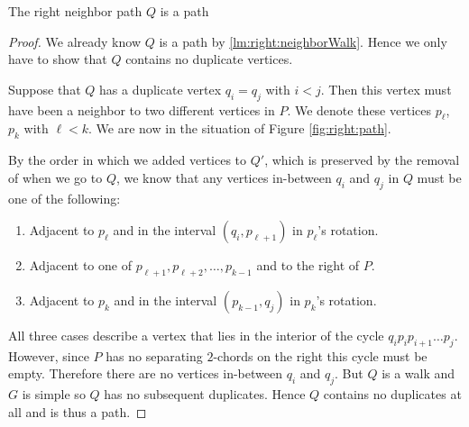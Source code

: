     \begin{lemma}
      \label{lm:right:neighborPath}
      The right neighbor path $Q$ is a path
    \end{lemma}
    \begin{proof}
      We already know $Q$ is a path by \ref{lm:right:neighborWalk}. Hence we only have to show that $Q$ contains no duplicate vertices.

      Suppose that $Q$ has a duplicate vertex $q_i=q_j$ with $i<j$. Then this vertex must have been a neighbor to two different vertices in $P$. We denote these vertices $p_\ell$, $p_k$ with $\ell<k$. We are now in the situation of Figure \ref{fig:right:path}.

      By the order in which we added vertices to $Q'$, which is preserved by the removal of when we go to $Q$, we know that any vertices in-between $q_i$ and $q_j$ in $Q$ must be one of the following:
      \begin{enumerate}
        \item Adjacent to $p_\ell$ and in the interval $(q_i, p_{\ell+1})$ in $p_\ell$'s rotation.
        \item Adjacent to one of $p_{\ell+1},  p_{\ell+2},\ldots, p_{k-1}$ and to the right of $P$.
        \item Adjacent to $p_k$ and in the interval $(p_{k-1}, q_j)$ in $p_k$'s rotation.
      \end{enumerate}


      All three cases describe a vertex that lies in the interior of the cycle $q_i p_i p_{i+1} \ldots p_j$. However, since $P$ has no separating $2$-chords on the right this cycle must be empty. Therefore there are no vertices in-between $q_i$ and $q_j$. But $Q$ is a walk and $G$ is simple  so $Q$ has no subsequent duplicates. Hence $Q$ contains no duplicates at all and is thus a path.
    \end{proof}

